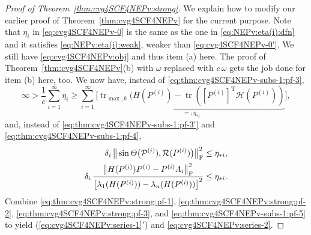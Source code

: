 \documentclass[11pt]{article}
\def\scrH{\mathscr{H}}
\def\cP{{\cal P}}
\def\cR{{\cal R}}
\DeclareMathOperator{\tr}{tr}
\DeclareMathOperator{\F}{F}
\DeclareMathOperator{\T}{T}
\theoremstyle{definition}
\numberwithin{equation}{section}
\begin{document}
\begin{proof}[Proof of Theorem~\ref{thm:cvg4SCF4NEPv:strong}]
We explain how to modify our earlier proof of Theorem~\ref{thm:cvg4SCF4NEPv} for the current purpose.
Note that $\eta_i$ in \eqref{eq:cvg4SCF4NEPv-0} is the same as the one in \eqref{eq:NEPv:eta(i):dfn}
and it satisfies \eqref{eq:NEPv:eta(i):weak}, weaker than \eqref{eq:cvg4SCF4NEPv-0'}.
We still have \eqref{eq:cvg4SCF4NEPv:obj} and thus item (a) here. The proof of
Theorem~\ref{thm:cvg4SCF4NEPv}(b) with $\omega$ replaced with $c\,\omega$ gets the job done for
item (b) here, too. We now have, instead of \eqref{eq:thm:cvg4SCF4NEPv-subs-1:pf-3},
\begin{equation}\label{eq:thm:cvg4SCF4NEPv:strong:pf-1}
\infty>\frac 1c\sum_{i=1}^{\infty}\eta_i\ge \sum_{i=1}^{\infty}\Big[\underbrace{\tr_{\max,k}(H(P^{(i)})-\tr([P^{(i)}]^{\T}\scrH(P^{(i)}))}_{=:\eta_{*i}}\Big],
\end{equation}
and, instead of \eqref{eq:thm:cvg4SCF4NEPv-subs-1:pf-3'} and \eqref{eq:thm:cvg4SCF4NEPv-subs-1:pf-4},
\begin{align}
\delta_i\,\big\|\sin\Theta\big(\cP^{(i)}),\cR(P^{(i)})\big)\big\|_{\F}^2
   &\le \eta_{*i}, \label{eq:thm:cvg4SCF4NEPv:strong:pf-2} \\
\delta_i\,\frac {\big\|H(P^{(i)})P^{(i)}-P^{(i)}\Lambda_i\big\|_{\F}^2}
                {\big[\lambda_1(H(P^{(i)}))-\lambda_n(H(P^{(i)}))\big]^2}
     &\le \eta_{*i}.  \label{eq:thm:cvg4SCF4NEPv:strong:pf-3}
\end{align}
Combine \eqref{eq:thm:cvg4SCF4NEPv:strong:pf-1}, \eqref{eq:thm:cvg4SCF4NEPv:strong:pf-2}, \eqref{eq:thm:cvg4SCF4NEPv:strong:pf-3}, and \eqref{eq:thm:cvg4SCF4NEPv-subs-1:pf-5} to yield (\ref{eq:cvg4SCF4NEPv:series-1}$'$) and
\eqref{eq:cvg4SCF4NEPv:series-2}.
\end{proof}
\end{document}
